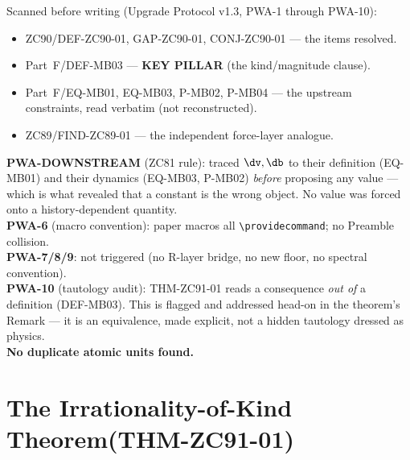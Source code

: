 \documentclass[12pt, a4paper]{article}
\begin{document}
\begin{formalbox}[title={Pre-Work Audit Record --- ZC91}]
Scanned before writing (Upgrade Protocol v1.3, PWA-1 through PWA-10):
\begin{itemize}[leftmargin=2em, noitemsep]
  \item ZC90/DEF-ZC90-01, GAP-ZC90-01, CONJ-ZC90-01 --- the items resolved.
  \item Part~F/DEF-MB03 --- \textbf{KEY PILLAR} (the kind/magnitude clause).
  \item Part~F/EQ-MB01, EQ-MB03, P-MB02, P-MB04 --- the upstream constraints,
    read verbatim (not reconstructed).
  \item ZC89/FIND-ZC89-01 --- the independent force-layer analogue.
\end{itemize}

\textbf{PWA-DOWNSTREAM} (ZC81 rule): traced $\dv,\db$ to their definition
(EQ-MB01) and their dynamics (EQ-MB03, P-MB02) \emph{before} proposing any
value --- which is what revealed that a constant is the wrong object. No
value was forced onto a history-dependent quantity.\\
\textbf{PWA-6} (macro convention): paper macros all
\texttt{\textbackslash providecommand}; no Preamble collision.\\
\textbf{PWA-7/8/9}: not triggered (no R-layer bridge, no new floor, no
spectral convention).\\
\textbf{PWA-10} (tautology audit): THM-ZC91-01 reads a consequence
\emph{out of} a definition (DEF-MB03). This is flagged and addressed
head-on in the theorem's Remark --- it is an equivalence, made explicit,
not a hidden tautology dressed as physics.\\
\textbf{No duplicate atomic units found.}
\end{formalbox}

\newpage


\section{The Irrationality-of-Kind Theorem\quad(THM-ZC91-01)}
\label{sec:thm-zc91}
\end{document}
